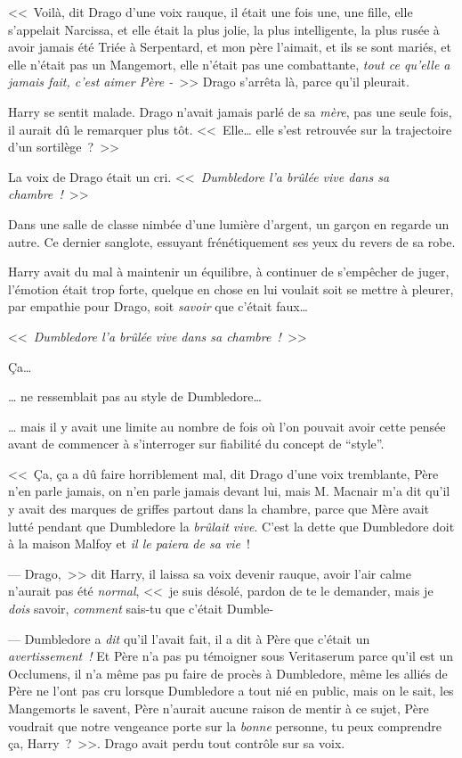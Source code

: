 <<~Voilà, dit Drago d'une voix rauque, il était une fois une, une fille, elle s'appelait Narcissa, et elle était la plus jolie, la plus intelligente, la plus rusée à avoir jamais été Triée à Serpentard, et mon père l'aimait, et ils se sont mariés, et elle n'était pas un Mangemort, elle n'était pas une combattante, \emph{tout ce qu'elle a jamais fait, c'est aimer Père -}~>> Drago s'arrêta là, parce qu'il pleurait.

Harry se sentit malade. Drago n'avait jamais parlé de sa \emph{mère}, pas une seule fois, il aurait dû le remarquer plus tôt. <<~Elle… elle s'est retrouvée sur la trajectoire d'un sortilège~?~>>

La voix de Drago était un cri. <<~\emph{Dumbledore l'a brûlée vive dans sa chambre~!}~>>

\later

Dans une salle de classe nimbée d'une lumière d'argent, un garçon en regarde un autre. Ce dernier sanglote, essuyant frénétiquement ses yeux du revers de sa robe.

Harry avait du mal à maintenir un équilibre, à continuer de s'empêcher de juger, l'émotion était trop forte, quelque en chose en lui voulait soit se mettre à pleurer, par empathie pour Drago, soit \emph{savoir} que c'était faux…

<<~\emph{Dumbledore l'a brûlée vive dans sa chambre~!}~>>

Ça…

… ne ressemblait pas au style de Dumbledore…

… mais il y avait une limite au nombre de fois où l'on pouvait avoir cette pensée avant de commencer à s'interroger sur fiabilité du concept de “style”.

<<~Ça, ça a dû faire horriblement mal, dit Drago d'une voix tremblante, Père n'en parle jamais, on n'en parle jamais devant lui, mais M. Macnair m'a dit qu'il y avait des marques de griffes partout dans la chambre, parce que Mère avait lutté pendant que Dumbledore la \emph{brûlait vive}. C'est la dette que Dumbledore doit à la maison Malfoy et \emph{il le paiera de sa vie}~!

--- Drago,~>> dit Harry, il laissa sa voix devenir rauque, avoir l'air calme n'aurait pas été \emph{normal}, <<~je suis désolé, pardon de te le demander, mais je \emph{dois} savoir, \emph{comment} sais-tu que c'était Dumble-

--- Dumbledore a \emph{dit} qu'il l'avait fait, il a dit à Père que c'était un \emph{avertissement~!} Et Père n'a pas pu témoigner sous Veritaserum parce qu'il est un Occlumens, il n'a même pas pu faire de procès à Dumbledore, même les alliés de Père ne l'ont pas cru lorsque Dumbledore a tout nié en public, mais on le sait, les Mangemorts le savent, Père n'aurait aucune raison de mentir à ce sujet, Père voudrait que notre vengeance porte sur la \emph{bonne} personne, tu peux comprendre ça, Harry~?~>>. Drago avait perdu tout contrôle sur sa voix.

